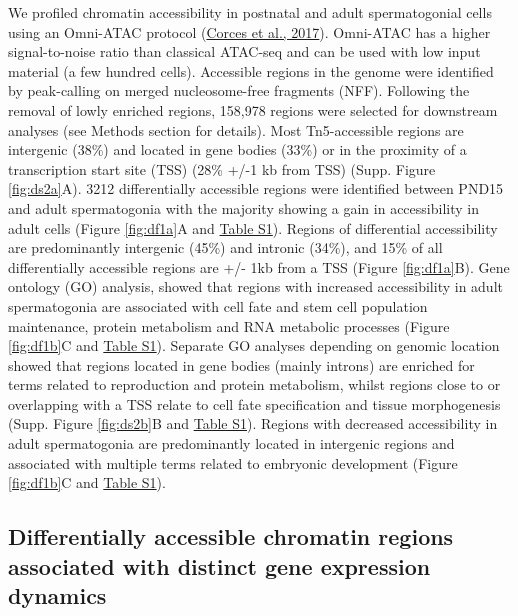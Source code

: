 \documentclass[12pt,twoside]{reedthesis}
\begin{document}
We profiled chromatin accessibility in postnatal and adult
spermatogonial cells using an Omni-ATAC protocol (\protect\hyperlink{ref-corces2017}{Corces et al., 2017}).
Omni-ATAC has a higher signal-to-noise ratio than classical ATAC-seq and
can be used with low input material (a few hundred cells). Accessible
regions in the genome were identified by peak-calling on merged
nucleosome-free fragments (NFF). Following the removal of lowly enriched
regions, 158,978 regions were selected for downstream analyses (see
Methods section for details). Most Tn5-accessible regions are intergenic
(38\%) and located in gene bodies (33\%) or in the proximity of a
transcription start site (TSS) (28\% +/-1 kb from TSS) (Supp. Figure \ref{fig:ds2a}A). 3212
differentially accessible regions were identified between PND15 and
adult spermatogonia with the majority showing a gain in accessibility in
adult cells (Figure \ref{fig:df1a}A and \protect\hyperlink{st}{Table S1}). Regions of differential
accessibility are predominantly intergenic (45\%) and intronic (34\%), and
15\% of all differentially accessible regions are +/- 1kb from a TSS
(Figure \ref{fig:df1a}B). Gene ontology (GO) analysis, showed that regions with
increased accessibility in adult spermatogonia are associated with cell
fate and stem cell population maintenance, protein metabolism and RNA
metabolic processes (Figure \ref{fig:df1b}C and \protect\hyperlink{st}{Table S1}). Separate GO analyses
depending on genomic location showed that regions located in gene bodies
(mainly introns) are enriched for terms related to reproduction and
protein metabolism, whilst regions close to or overlapping with a TSS
relate to cell fate specification and tissue morphogenesis (Supp. Figure \ref{fig:ds2b}B and
\protect\hyperlink{st}{Table S1}). Regions with decreased accessibility in adult spermatogonia
are predominantly located in intergenic regions and associated with
multiple terms related to embryonic development (Figure \ref{fig:df1b}C and \protect\hyperlink{st}{Table S1}).

\hypertarget{differentially-accessible-chromatin-regions-associated-with-distinct-gene-expression-dynamics}{%
\subsection{Differentially accessible chromatin regions associated with distinct gene expression dynamics}\label{differentially-accessible-chromatin-regions-associated-with-distinct-gene-expression-dynamics}}
\end{document}
